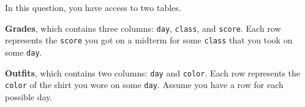 In this question, you have access to two tables.

\textbf{Grades}, which contains three columns: \lstinline{day}, \lstinline{class}, and \lstinline{score}. Each row represents the \lstinline{score} you got on a midterm for some \lstinline{class} that you took on some \lstinline{day}.

\textbf{Outfits}, which contains two columns: \lstinline{day} and \lstinline{color}. Each row represents the \lstinline{color} of the shirt you wore on some \lstinline{day}. Assume you have a row for each possible day.

